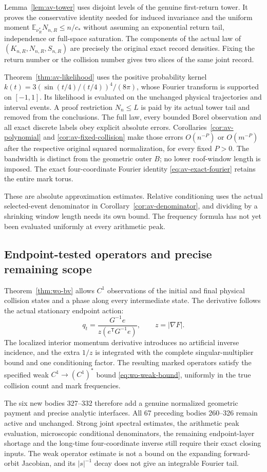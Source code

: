 Lemma~\ref{lem:av-tower} uses disjoint levels of the genuine
first-return tower. It proves the conservative identity needed
for induced invariance and the uniform moment
$\mathbb E_{\nu_R^*}N_{n,R}\le n/c_*$ without assuming an
exponential return tail, independence or full-space saturation.
The components of the actual law of
$(K_{n,R},N_{n,R},S_{n,R})$ are precisely the original exact
record densities. Fixing the return number or the collision
number gives two slices of the same joint record.

Theorem~\ref{thm:av-likelihood} uses the positive probability
kernel
$k(t)=3(\sin(t/4)/(t/4))^4/(8\pi)$, whose Fourier transform
is supported on $[-1,1]$. Its likelihood is evaluated on the
unchanged physical trajectories and interval events. A proof
restriction $N_n\le L$ is paid by its actual tower tail and
removed from the conclusions. The full law, every bounded
Borel observation and all exact discrete labels obey explicit
absolute errors. Corollaries~\ref{cor:av-polynomial} and
\ref{cor:av-fixed-collision} make those errors $O(n^{-P})$
or $O(m^{-P})$ after the respective original squared
normalization, for every fixed $P>0$. The bandwidth is distinct
from the geometric outer $B$; no lower roof-window length is
imposed. The exact four-coordinate Fourier identity
\eqref{eq:av-exact-fourier} retains the entire mark torus.

These are absolute approximation estimates. Relative conditioning
uses the actual selected-event denominator in
Corollary~\ref{cor:av-denominator}, and dividing by a shrinking
window length needs its own bound. The frequency formula has
not yet been evaluated uniformly at every arithmetic peak.

\subsection*{Endpoint-tested operators and precise remaining scope}
Theorem~\ref{thm:wo-bv} allows $C^1$ observations of the initial
and final physical collision states and a phase along every
intermediate state. The derivative follows the actual stationary
endpoint action:
\[
 q_t=\frac{G^{-1}e}{z(e^{\mathsf T}G^{-1}e)},\qquad z=|\nabla F|.
\]
The localized interior momentum derivative introduces no artificial
inverse incidence, and the extra $1/z$ is integrated with the
complete singular-multiplier bound and one conditioning factor.
The resulting marked operators satisfy the specified weak
$C^1\to(C^1)^*$ bound \eqref{eq:wo-weak-bound}, uniformly in
the true collision count and mark frequencies.

The six new bodies 327--332 therefore add a genuine normalized
geometric payment and precise analytic interfaces. All 67
preceding bodies 260--326 remain active and unchanged. Strong
joint spectral estimates, the arithmetic peak evaluation,
microscopic conditional denominators, the remaining endpoint-layer
shortage and the long-time four-coordinate inverse still require
their exact closing inputs. The weak operator estimate is not a
bound on the expanding forward-orbit Jacobian, and its
$|s|^{-1}$ decay does not give an integrable Fourier tail.

